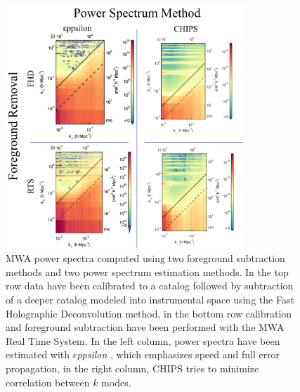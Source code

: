 \documentclass[preprint]{aastex}
\def\eppsilon{{\it $\epsilon$ppsilon }}
\begin{document}
\begin{figure}[h!]
\begin{center}
\includegraphics[width=0.8\textwidth]{figures/MWA_PS_compare/MWA_PS_compare.png}
\caption{MWA power spectra computed using two foreground subtraction methods and two power spectrum estimation methods.  In the top row data have been calibrated to a catalog followed by subtraction of a deeper catalog modeled into instrumental space using the Fast Holographic Deconvolution method, in the bottom row calibration and foreground subtraction have been performed with the MWA Real Time System.  In the left column, power spectra have been estimated with \eppsilon, which emphasizes speed and full error propagation, in the right column, CHIPS tries to minimize correlation between $k$ modes.\label{fig:pspec_compare}}
\end{center}
\end{figure}
\end{document}
